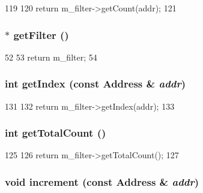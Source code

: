 \begin{DoxyCode}
119 {
120     return m_filter->getCount(addr);
121 }
\end{DoxyCode}
\hypertarget{classGenericBloomFilter_a6647c0f786a7ceddc8a0fff26702b841}{
\subsubsection[{getFilter}]{$\ast$ getFilter ()}}
\label{classGenericBloomFilter_a6647c0f786a7ceddc8a0fff26702b841}



\begin{DoxyCode}
52     {
53         return m_filter;
54     }
\end{DoxyCode}
\hypertarget{classGenericBloomFilter_a19f42f6f2fc3501021b768f0df8108b2}{
\subsubsection[{getIndex}]{\setlength{\rightskip}{0pt plus 5cm}int getIndex (const {\bf Address} \& {\em addr})}}
\label{classGenericBloomFilter_a19f42f6f2fc3501021b768f0df8108b2}



\begin{DoxyCode}
131 {
132     return m_filter->getIndex(addr);
133 }
\end{DoxyCode}
\hypertarget{classGenericBloomFilter_a97f66183ea41a7c123bab9dd5313a74a}{
\subsubsection[{getTotalCount}]{\setlength{\rightskip}{0pt plus 5cm}int getTotalCount ()}}
\label{classGenericBloomFilter_a97f66183ea41a7c123bab9dd5313a74a}



\begin{DoxyCode}
125 {
126     return m_filter->getTotalCount();
127 }
\end{DoxyCode}
\hypertarget{classGenericBloomFilter_a3e860ad851b771ac3b6eeb1716eb56bc}{
\subsubsection[{increment}]{\setlength{\rightskip}{0pt plus 5cm}void increment (const {\bf Address} \& {\em addr})}}
\label{classGenericBloomFilter_a3e860ad851b771ac3b6eeb1716eb56bc}



